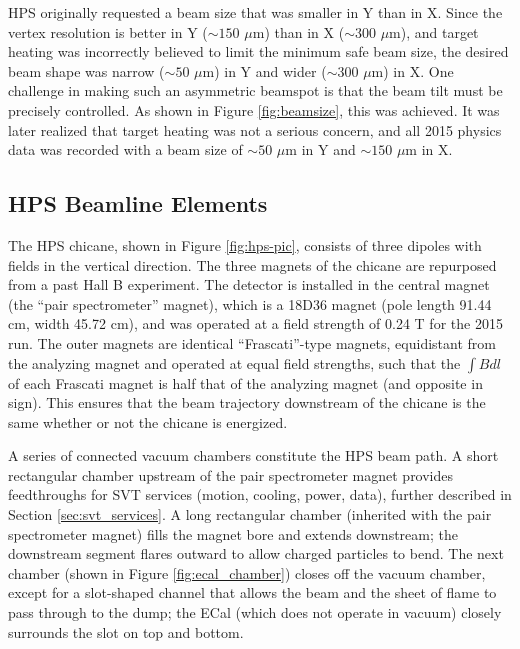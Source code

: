 HPS originally requested a beam size that was smaller in Y than in X.
Since the vertex resolution is better in Y ($\sim 150$ $\mu$m) than in X ($\sim 300$ $\mu$m), and target heating was incorrectly believed to limit the minimum safe beam size, the desired beam shape was narrow ($\sim 50$ $\mu$m) in Y and wider ($\sim 300$ $\mu$m) in X.
One challenge in making such an asymmetric beamspot is that the beam tilt must be precisely controlled.
As shown in Figure \ref{fig:beamsize}, this was achieved.
It was later realized that target heating was not a serious concern, and all 2015 physics data was recorded with a beam size of $\sim 50$ $\mu$m in Y and $\sim 150$ $\mu$m in X.

\subsection{HPS Beamline Elements}

The HPS chicane, shown in Figure \ref{fig:hps-pic}, consists of three dipoles with fields in the vertical direction.
The three magnets of the chicane are repurposed from a past Hall B experiment.
The detector is installed in the central magnet (the ``pair spectrometer'' magnet), which is a 18D36 magnet (pole length 91.44 cm, width 45.72 cm), and was operated at a field strength of 0.24 T for the 2015 run.
The outer magnets are identical ``Frascati''-type magnets, equidistant from the analyzing magnet and operated at equal field strengths, such that the $\int B dl$ of each Frascati magnet is half that of the analyzing magnet (and opposite in sign).
This ensures that the beam trajectory downstream of the chicane is the same whether or not the chicane is energized.

A series of connected vacuum chambers constitute the HPS beam path.
A short rectangular chamber upstream of the pair spectrometer magnet provides feedthroughs for SVT services (motion, cooling, power, data), further described in Section \ref{sec:svt_services}.
A long rectangular chamber (inherited with the pair spectrometer magnet) fills the magnet bore and extends downstream; the downstream segment flares outward to allow charged particles to bend.
The next chamber (shown in Figure \ref{fig:ecal_chamber}) closes off the vacuum chamber, except for a slot-shaped channel that allows the beam and the sheet of flame to pass through to the dump; the ECal (which does not operate in vacuum) closely surrounds the slot on top and bottom.


